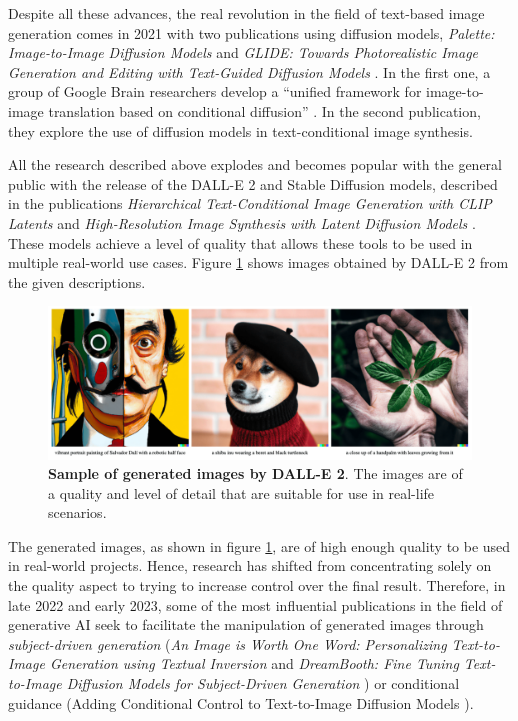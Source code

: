 Despite all these advances, the real revolution in the field of text-based image generation comes in 2021 with two publications using diffusion models, \textit{Palette: Image-to-Image Diffusion Models} \cite{saharia2022palette} and \textit{GLIDE: Towards Photorealistic Image Generation and Editing with Text-Guided Diffusion Models} \cite{nichol2021glide}. In the first one, a group of Google Brain researchers develop a ``unified framework for image-to-image translation based on conditional diffusion'' \cite{saharia2022palette}. In the second publication, they explore the use of diffusion models in text-conditional image synthesis. 

All the research described above explodes and becomes popular with the general public with the release of the DALL-E 2 and Stable Diffusion models, described in the publications \textit{Hierarchical Text-Conditional Image Generation with CLIP Latents} \cite{ramesh2022hierarchical} and \textit{High-Resolution Image Synthesis with Latent Diffusion Models} \cite{rombach2022high}. These models achieve a level of quality that allows these tools to be used in multiple real-world use cases. Figure \ref{fig:DallE2} shows images obtained by DALL-E 2 from the given descriptions. 

\begin{figure}
    \centering
    \includegraphics[width=1\textwidth]{Pictures/DallE2.png} 
    \caption{\textbf{Sample of generated images by DALL-E 2}. The images are of a quality and level of detail that are suitable for use in real-life scenarios. \cite{ramesh2022hierarchical}}
    \label{fig:DallE2}
\end{figure}

The generated images, as shown in figure \ref{fig:DallE2}, are of high enough quality to be used in real-world projects. Hence, research has shifted from concentrating solely on the quality aspect to trying to increase control over the final result. Therefore, in late 2022 and early 2023, some of the most influential publications in the field of generative AI seek to facilitate the manipulation of generated images through \textit{subject-driven generation} (\textit{\textit{An Image is Worth One Word: Personalizing Text-to-Image Generation using Textual Inversion}} \cite{gal2022image} and \textit{DreamBooth: Fine Tuning Text-to-Image Diffusion Models for Subject-Driven Generation} \cite{ruiz2023dreambooth}) or conditional guidance (Adding Conditional Control to Text-to-Image Diffusion Models \cite{zhang2023adding}).

